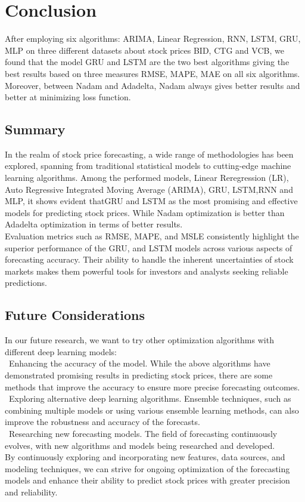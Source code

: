 \documentclass{ieeeojies}
\begin{document}
\section{Conclusion}
After employing six algorithms: ARIMA, Linear Regression, RNN, LSTM, GRU, MLP on three different datasets about stock prices BID, CTG and VCB, we found that the model GRU and LSTM are the two best algorithms giving the best results based on three measures RMSE, MAPE, MAE on all six algorithms. Moreover, between Nadam and Adadelta, Nadam always gives better results and better at minimizing loss function. 
\subsection{Summary}
In the realm of stock price forecasting, a wide range of methodologies has been explored, spanning from traditional statistical models to cutting-edge machine learning algorithms. Among the performed models, Linear Reregression (LR), Auto Regressive Integrated Moving Average (ARIMA), GRU, LSTM,RNN and MLP, it shows evident thatGRU and LSTM as the most promising and effective models for predicting stock prices. While Nadam optimization is better than Adadelta optimization in terms of better results.\\ Evaluation metrics such as RMSE, MAPE, and MSLE consistently highlight the superior performance of the  GRU, and LSTM models across various aspects of forecasting accuracy. Their ability to handle the inherent uncertainties of stock markets makes them powerful tools for investors and analysts seeking reliable predictions.
\subsection{Future Considerations}
In our future research, we want to try other optimization algorithms with different deep learning models:\\
\indent\textbullet\ Enhancing the accuracy of the model. While the above algorithms have demonstrated promising results in predicting stock prices, there are some methods that improve the accuracy to ensure more precise forecasting outcomes.\\
\indent\textbullet\ Exploring alternative deep learning algorithms. Ensemble techniques, such as combining multiple models or using various ensemble learning methods, can also improve the robustness and accuracy of the forecasts.\\
\indent\textbullet\ Researching new forecasting models. The field of forecasting continuously evolves, with new algorithms and models being researched and developed.\\
By continuously exploring and incorporating new features, data sources, and modeling techniques, we can strive for ongoing optimization of the forecasting models and enhance their ability to predict stock prices with greater precision and reliability.
\end{document}
